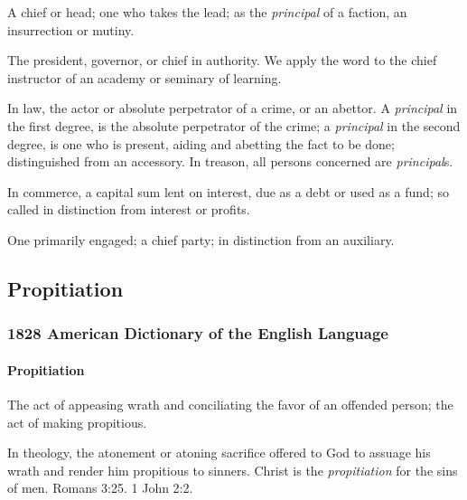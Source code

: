 				\begin{compactitem}
					\item A chief or head; one who takes the lead; as the \textit{principal} of a faction, an insurrection or mutiny.
					\item[1] The president, governor, or chief in authority. We apply the word to the chief instructor of an academy or seminary of learning.
					\item[2] In law, the actor or absolute perpetrator of a crime, or an abettor. A \textit{principal} in the first degree, is the absolute perpetrator of the crime; a \textit{principal} in the second degree, is one who is present, aiding and abetting the fact to be done; distinguished from an accessory. In treason, all persons concerned are \textit{principal}s.
					\item[3] In commerce, a capital sum lent on interest, due as a debt or used as a fund; so called in distinction from interest or profits.
					\item[4] One primarily engaged; a chief party; in distinction from an auxiliary.
				\end{compactitem}
			
	\subsection{Propitiation} %
		\label{PROPITIATION}
		
		\subsubsection{1828 American Dictionary of the English Language}
		
			\paragraph{Propitiation}
		
				\begin{compactitem}
					\item[1] The act of appeasing wrath and conciliating the favor of an offended person; the act of making propitious.
					\item[2] In theology, the atonement or atoning sacrifice offered to God to assuage his wrath and render him propitious to sinners. Christ is the \textit{propitiation} for the sins of men. Romans 3:25. 1 John 2:2.
				\end{compactitem}
				
